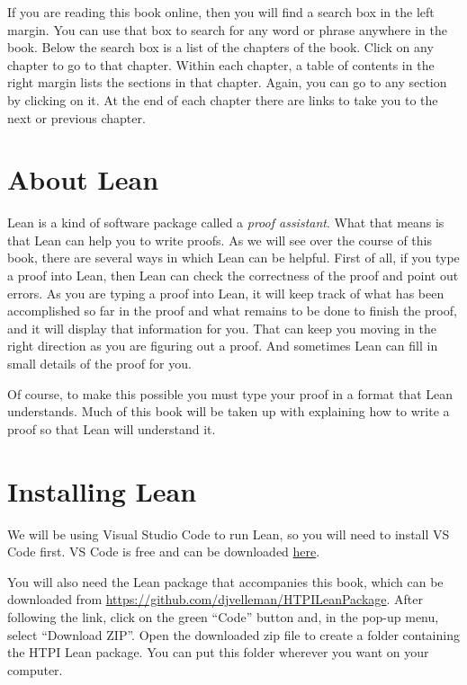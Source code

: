 \documentclass[
  letterpaper,
  DIV=11,
  numbers=noendperiod]{scrreprt}
\begin{document}
If you are reading this book online, then you will find a search box in
the left margin. You can use that box to search for any word or phrase
anywhere in the book. Below the search box is a list of the chapters of
the book. Click on any chapter to go to that chapter. Within each
chapter, a table of contents in the right margin lists the sections in
that chapter. Again, you can go to any section by clicking on it. At the
end of each chapter there are links to take you to the next or previous
chapter.

\hypertarget{about-lean}{%
\section*{About Lean}\label{about-lean}}

Lean is a kind of software package called a \emph{proof assistant}. What
that means is that Lean can help you to write proofs. As we will see
over the course of this book, there are several ways in which Lean can
be helpful. First of all, if you type a proof into Lean, then Lean can
check the correctness of the proof and point out errors. As you are
typing a proof into Lean, it will keep track of what has been
accomplished so far in the proof and what remains to be done to finish
the proof, and it will display that information for you. That can keep
you moving in the right direction as you are figuring out a proof. And
sometimes Lean can fill in small details of the proof for you.

Of course, to make this possible you must type your proof in a format
that Lean understands. Much of this book will be taken up with
explaining how to write a proof so that Lean will understand it.

\hypertarget{installing-lean}{%
\section*{Installing Lean}\label{installing-lean}}

We will be using Visual Studio Code to run Lean, so you will need to
install VS Code first. VS Code is free and can be downloaded
\href{https://code.visualstudio.com}{here}.

You will also need the Lean package that accompanies this book, which
can be downloaded from
\url{https://github.com/djvelleman/HTPILeanPackage}. After following the
link, click on the green ``Code'' button and, in the pop-up menu, select
``Download ZIP''. Open the downloaded zip file to create a folder
containing the HTPI Lean package. You can put this folder wherever you
want on your computer.
\end{document}
